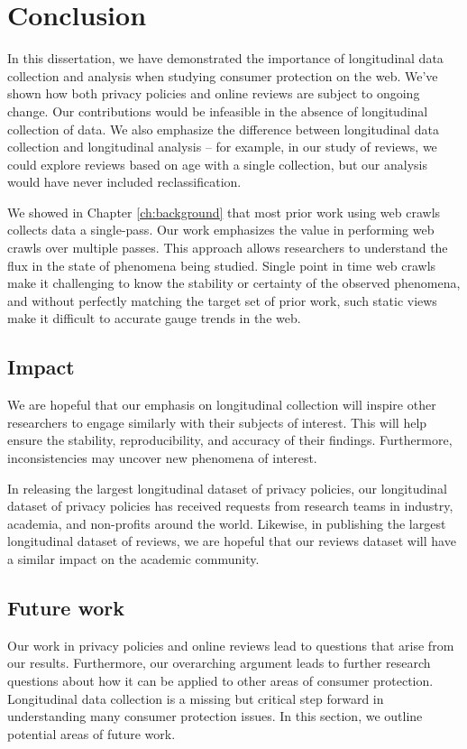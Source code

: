 \chapter{Conclusion} \label{ch:conclusion}
In this dissertation, we have demonstrated the importance of longitudinal data collection and analysis when studying consumer protection on the web. We've shown how both privacy policies and online reviews are subject to ongoing change. Our contributions would be infeasible in the absence of longitudinal collection of data. We also emphasize the difference between longitudinal data collection and longitudinal analysis -- for example, in our study of reviews, we could explore reviews based on age with a single collection, but our analysis would have never included reclassification.

We showed in Chapter \ref{ch:background} that most prior work using web crawls collects data a single-pass. Our work emphasizes the value in performing web crawls over multiple passes. This approach allows researchers to understand the flux in the state of phenomena being studied. Single point in time web crawls make it challenging to know the stability or certainty of the observed phenomena, and without perfectly matching the target set of prior work, such static views make it difficult to accurate gauge trends in the web.

\section{Impact}
We are hopeful that our emphasis on longitudinal collection will inspire other researchers to engage similarly with their subjects of interest. This will help ensure the stability, reproducibility, and accuracy of their findings. Furthermore, inconsistencies may uncover new phenomena of interest.

In releasing the largest longitudinal dataset of privacy policies, our longitudinal dataset of privacy policies has received  requests from research teams in industry, academia, and non-profits around the world. Likewise, in publishing the largest longitudinal dataset of reviews, we are hopeful that our reviews dataset will have a similar impact on the academic community.

\section{Future work} \label{sec:conclusion:futurework}
Our work in privacy policies and online reviews lead to questions that arise from our results. Furthermore, our overarching argument leads to further research questions about how it can be applied to other areas of consumer protection. Longitudinal data collection is a missing but critical step forward in understanding many consumer protection issues. In this section, we outline potential areas of future work.

